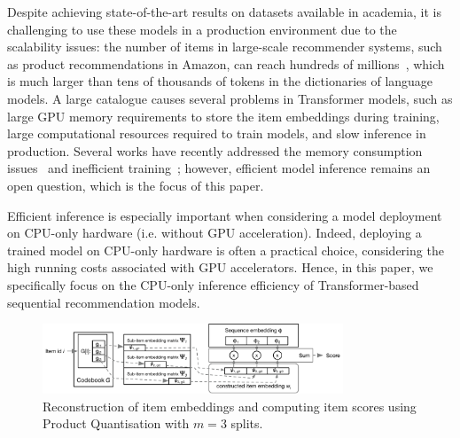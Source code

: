\documentclass[sigconf,natbib=true, review=False]{acmart} %
\newcommand{\sasha}[1]{\textcolor[HTML]{000000}{#1}}
\newcommand{\rsasha}[1]{\textcolor[HTML]{000000}{#1}}
\newcommand{\scr}[1]{\textcolor[HTML]{000000}{#1}}
\begin{document}
 Despite achieving state-of-the-art results on \rsasha{datasets available in academia}, it is challenging to use these models in a production environment due to the scalability issues: the number of items in large-scale recommender systems, such as product recommendations in Amazon, can reach hundreds of millions~\cite{AmazonStatisticsUptoDate}, which is much larger than tens of thousands of tokens in the dictionaries of language models. A large catalogue causes \scr{several problems} in Transformer models, such as large GPU memory requirements to store the item embeddings \rsasha{during training}, large computational resources required to train models, and slow inference in production. Several works have recently addressed the memory consumption issues~\cite{xiaEfficientOnDeviceSessionBased2023, petrovRecJPQTrainingLargeCatalogue2024} and inefficient training~\cite{klenitskiyTurningDrossGold2023, petrovGSASRecReducingOverconfidence2023, petrovRSSEffectiveEfficient2025}; however, efficient model inference remains an open question, which is the focus of this paper.

\rsasha{Efficient inference is especially important when considering a model deployment on CPU-only hardware (i.e. without GPU acceleration). Indeed, deploying a trained model on CPU-only hardware is often a practical choice, considering the high \rsasha{running} costs associated with GPU accelerators. 
Hence, in this paper, we specifically focus on the CPU-only inference efficiency of Transformer-based sequential recommendation models.}

\begin{figure}[tb]\hspace{-3mm}
    \vspace{-0.5\baselineskip}
\includegraphics[width=0.8\textwidth]{figures/pq_scoring_graffle.pdf}%
    \caption{Reconstruction of item embeddings \sasha{and computing item scores} using Product Quantisation \sasha{with $m=3$ splits.} }\vspace{-.75\baselineskip}
    \label{fig:embedding_reconstruction}
\end{figure}
\end{document}
